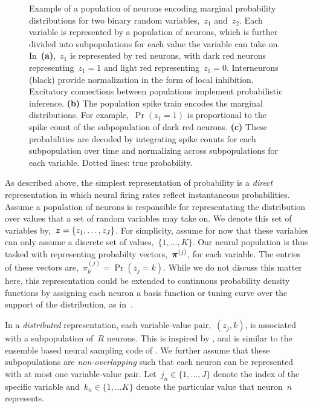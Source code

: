 \begin{figure}[t!]
\begin{subfigure}[b]{1.8in}
    \label{fig:representation_prs}
  \end{subfigure}
  \vspace{-.25in}
  \caption[Example of a population of neurons encoding a probability
    distribution] {Example of a population of neurons encoding marginal
    probability distributions for two binary random variables,~$z_1$
    and~$z_2$. Each variable is represented by a population of neurons,
    which is further divided into subpopulations for each value the variable
    can take on. In~\textbf{(a)},~$z_1$ is represented by red neurons, with
    dark red neurons representing~${z_1=1}$ and light red representing~${z_1=0}$.
    Interneurons (black) provide normalization in the form of local inhibition.
    Excitatory connections between populations implement probabilistic inference.
    \textbf{(b)} The population spike train encodes the marginal distributions.
    For example,~${\Pr(z_1=1)}$ is proportional to the spike count of the subpopulation
    of dark red neurons.
    \textbf{(c)} These probabilities are decoded by integrating
    spike counts for each subpopulation over time and normalizing across
    subpopulations for each variable. Dotted lines: true probability. 
  }
 \label{fig:representation}
\end{figure}


\sloppy
As described above, the simplest representation of probability is a \emph{direct}
representation in which neural firing rates reflect instantaneous
probabilities. Assume a population of neurons is responsible for
representating the distribution over values that a set of random
variables may take on. We denote this set of variables 
by,~${\boldsymbol{z} = \{z_1, \ldots, z_J\}}$.  For
simplicity, assume for now that these variables can only assume a
discrete set of values,~${\{1, \ldots, K\}}$.  Our
neural population is thus tasked with representing probabilty
vectors,~$\boldsymbol{\pi}^{(j)}$, for each 
variable. The entries of these vectors are,~${\pi^{(j)}_k = \Pr(z_j=k)}$.
While we do not discuss this matter here, this representation could
be extended to continuous probability density functions by assigning
each neuron a basis function or tuning curve over the support of the
distribution, as in~\cite{Barber2003, Ma2006, beck2007exact}. 

In a \emph{distributed} representation, each variable-value
pair,~$(z_j,k)$, is associated with a subpopulation of~$R$
neurons. This is inspired by \citet{valiant1994circuits,
  valiant2005memorization}, and is similar to the ensemble based
neural sampling code of \citet{legenstein2014ensembles}.  We further
assume that these subpopulations are \emph{non-overlapping} such that
each neuron can be represented with at most one variable-value pair.
Let~${j_n \in \{1, \ldots, J\}}$ denote the index of the specific
variable and~$k_n \in \{1, \ldots K\}$ denote the particular
value that neuron~$n$ represents.


